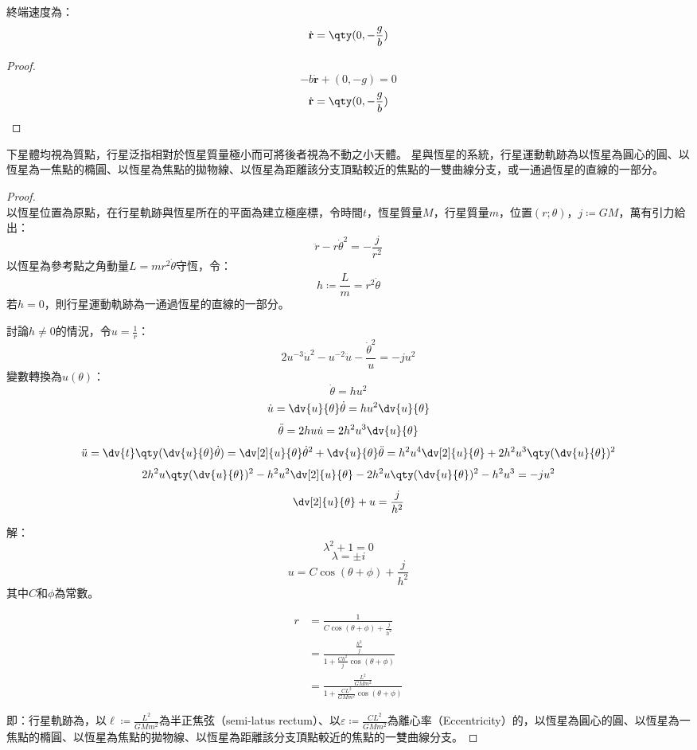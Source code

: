 \documentclass[a4paper,12pt]{article}
\begin{document}
終端速度為：
\[\dot{\mathbf{r}}=\qty(0,-\frac{g}{b})\]
\begin{proof}
\[-b\dot{\mathbf{r}}+(0,-g)=0\]
\[\dot{\mathbf{r}}=\qty(0,-\frac{g}{b})\]
\end{proof}
下星體均視為質點，行星泛指相對於恆星質量極小而可將後者視為不動之小天體。
星與恆星的系統，行星運動軌跡為以恆星為圓心的圓、以恆星為一焦點的橢圓、以恆星為焦點的拋物線、以恆星為距離該分支頂點較近的焦點的一雙曲線分支，或一通過恆星的直線的一部分。
\begin{proof}\mbox{}\\
以恆星位置為原點，在行星軌跡與恆星所在的平面為建立極座標，令時間$t$，恆星質量$M$，行星質量$m$，位置$(r;\theta)$，$j\coloneq GM$，萬有引力給出：
\[\ddot{r}-r\dot{\theta}^2=-\frac{j}{r^2}\]
以恆星為參考點之角動量$L=mr^2\dot{\theta}$守恆，令：
\[h\coloneq\frac{L}{m}=r^2\dot{\theta}\]
若$h=0$，則行星運動軌跡為一通過恆星的直線的一部分。

討論$h\neq0$的情況，令$u=\frac{1}{r}$：
\[2u^{-3}\dot{u}^2-u^{-2}\ddot{u}-\frac{\dot{\theta}^2}{u}=-ju^2\]
變數轉換為$u(\theta)$：
\[\dot{\theta}=h u^2\]
\[\dot{u}=\dv{u}{\theta}\dot{\theta}=h u^2\dv{u}{\theta}\]
\[\ddot{\theta}=2h u\dot{u}=2h^2u^3\dv{u}{\theta}\]
\[\ddot{u}=\dv{t}\qty(\dv{u}{\theta}\dot{\theta})=\dv[2]{u}{\theta}\dot{\theta}^2+\dv{u}{\theta}\ddot{\theta}=h^2u^4\dv[2]{u}{\theta}+2h^2u^3\qty(\dv{u}{\theta})^2\]
\[2h^2u\qty(\dv{u}{\theta})^2-h^2u^2\dv[2]{u}{\theta}-2h^2u\qty(\dv{u}{\theta})^2-h^2u^3=-ju^2\]
\[\dv[2]{u}{\theta}+u=\frac{j}{h^2}\]

解：
\[\lambda^2+1=0\]
\[\lambda=\pm i\]
\[u=C\cos(\theta+\phi)+\frac{j}{h^2}\]
其中$C$和$\phi$為常數。

\[\begin{aligned}
r&=\frac{1}{C\cos(\theta+\phi)+\frac{j}{h^2}}\\
&=\frac{\frac{h^2}{j}}{1+\frac{Ch^2}{j}\cos(\theta+\phi)}\\
&=\frac{\frac{L^2}{GMm^2}}{1+\frac{CL^2}{GMm^2}\cos(\theta+\phi)}
\end{aligned}\]

即：行星軌跡為，以$\ell\coloneq \frac{L^2}{GMm^2}$為半正焦弦（semi-latus rectum）、以$\varepsilon\coloneq \frac{CL^2}{GMm^2}$為離心率（Eccentricity）的，以恆星為圓心的圓、以恆星為一焦點的橢圓、以恆星為焦點的拋物線、以恆星為距離該分支頂點較近的焦點的一雙曲線分支。
\end{proof}
\end{document}
